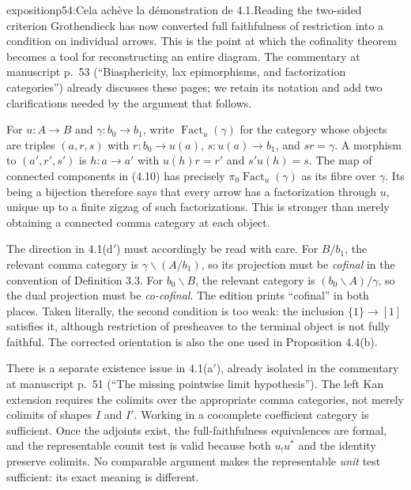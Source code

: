 \begin{dcomment}{exposition}{p54:Cela achève la démonstration de 4.1.}{Reading the two-sided criterion}
Grothendieck has now converted full faithfulness of restriction into a condition on individual arrows. This is the point at which the cofinality theorem becomes a tool for reconstructing an entire diagram. The commentary at manuscript p.~53 (``Biasphericity, lax epimorphisms, and factorization categories'') already discusses these pages; we retain its notation and add two clarifications needed by the argument that follows.

For $u:A\to B$ and $\gamma:b_0\to b_1$, write $\operatorname{Fact}_u(\gamma)$ for the category whose objects are triples $(a,r,s)$ with $r:b_0\to u(a)$, $s:u(a)\to b_1$, and $sr=\gamma$. A morphism to $(a',r',s')$ is $h:a\to a'$ with $u(h)r=r'$ and $s'u(h)=s$. The map of connected components in (4.10) has precisely $\pi_0\operatorname{Fact}_u(\gamma)$ as its fibre over $\gamma$. Its being a bijection therefore says that every arrow has a factorization through $u$, unique up to a finite zigzag of such factorizations. This is stronger than merely obtaining a connected comma category at each object.

The direction in 4.1(d$'$) must accordingly be read with care. For $B/b_1$, the relevant comma category is $\gamma\backslash(A/b_1)$, so its projection must be \emph{cofinal} in the convention of Definition 3.3. For $b_0\backslash B$, the relevant category is $(b_0\backslash A)/\gamma$, so the dual projection must be \emph{co-cofinal}. The edition prints ``cofinal'' in both places. Taken literally, the second condition is too weak: the inclusion $\{1\}\to[1]$ satisfies it, although restriction of presheaves to the terminal object is not fully faithful. The corrected orientation is also the one used in Proposition 4.4(b).

There is a separate existence issue in 4.1(a$'$), already isolated in the commentary at manuscript p.~51 (``The missing pointwise limit hypothesis''). The left Kan extension requires the colimits over the appropriate comma categories, not merely colimits of shapes $I$ and $I'$. Working in a cocomplete coefficient category is sufficient. Once the adjoints exist, the full-faithfulness equivalences are formal, and the representable counit test is valid because both $u_!u^*$ and the identity preserve colimits. No comparable argument makes the representable \emph{unit} test sufficient: its exact meaning is different.
\end{dcomment}

